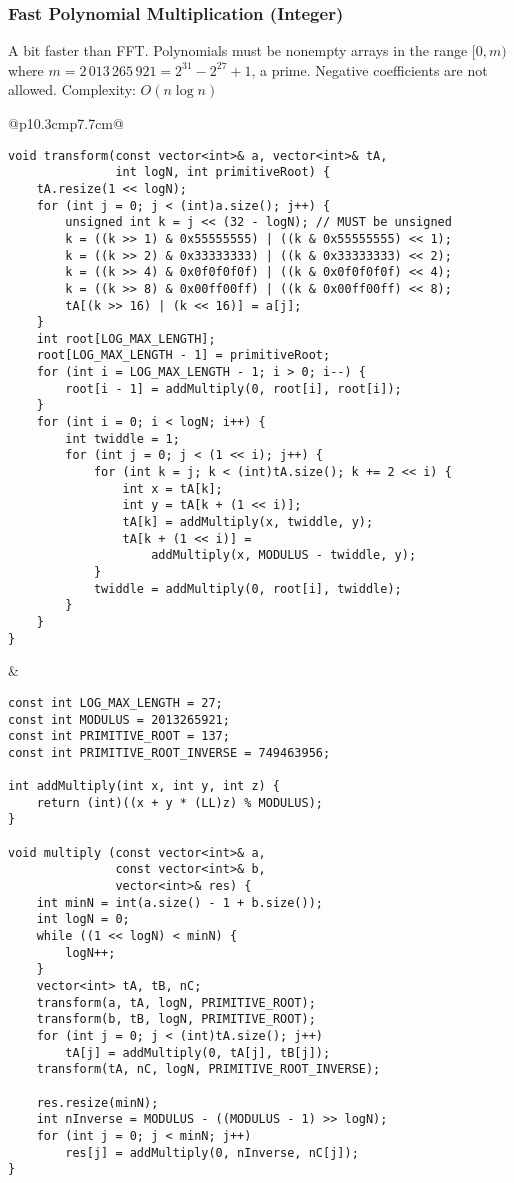 \documentclass[letterpaper]{article}
\begin{document}
\clearpage

\subsubsection{Fast Polynomial Multiplication (Integer)}
A bit faster than FFT. Polynomials must be nonempty arrays in the range $[0, m)$ where $m = 2\,013\,265\,921 = 2^{31} - 2^{27} + 1$, a prime. Negative coefficients are not allowed. Complexity: $O\left(n\log n\right)$

\begin{tabular}{@{}p{10.3cm}p{7.7cm}@{}}
\begin{lstlisting}
void transform(const vector<int>& a, vector<int>& tA,
               int logN, int primitiveRoot) {
	tA.resize(1 << logN);
	for (int j = 0; j < (int)a.size(); j++) {
		unsigned int k = j << (32 - logN); // MUST be unsigned
		k = ((k >> 1) & 0x55555555) | ((k & 0x55555555) << 1);
		k = ((k >> 2) & 0x33333333) | ((k & 0x33333333) << 2);
		k = ((k >> 4) & 0x0f0f0f0f) | ((k & 0x0f0f0f0f) << 4);
		k = ((k >> 8) & 0x00ff00ff) | ((k & 0x00ff00ff) << 8);
		tA[(k >> 16) | (k << 16)] = a[j];
	}
	int root[LOG_MAX_LENGTH];
	root[LOG_MAX_LENGTH - 1] = primitiveRoot;
	for (int i = LOG_MAX_LENGTH - 1; i > 0; i--) {
		root[i - 1] = addMultiply(0, root[i], root[i]);
	}
	for (int i = 0; i < logN; i++) {
		int twiddle = 1;
		for (int j = 0; j < (1 << i); j++) {
			for (int k = j; k < (int)tA.size(); k += 2 << i) {
				int x = tA[k];
				int y = tA[k + (1 << i)];
				tA[k] = addMultiply(x, twiddle, y);
				tA[k + (1 << i)] =
					addMultiply(x, MODULUS - twiddle, y);
			}
			twiddle = addMultiply(0, root[i], twiddle);
		}
	}
}
\end{lstlisting}
&
\begin{lstlisting}
const int LOG_MAX_LENGTH = 27;
const int MODULUS = 2013265921;
const int PRIMITIVE_ROOT = 137;
const int PRIMITIVE_ROOT_INVERSE = 749463956;

int addMultiply(int x, int y, int z) {
	return (int)((x + y * (LL)z) % MODULUS);
}

void multiply (const vector<int>& a,
               const vector<int>& b,
               vector<int>& res) {
	int minN = int(a.size() - 1 + b.size());
	int logN = 0;
	while ((1 << logN) < minN) {
		logN++;
	}
	vector<int> tA, tB, nC;
	transform(a, tA, logN, PRIMITIVE_ROOT);
	transform(b, tB, logN, PRIMITIVE_ROOT);
	for (int j = 0; j < (int)tA.size(); j++)
		tA[j] = addMultiply(0, tA[j], tB[j]);
	transform(tA, nC, logN, PRIMITIVE_ROOT_INVERSE);

	res.resize(minN);
	int nInverse = MODULUS - ((MODULUS - 1) >> logN);
	for (int j = 0; j < minN; j++)
		res[j] = addMultiply(0, nInverse, nC[j]);
}
\end{lstlisting}
\end{tabular}
\end{document}
